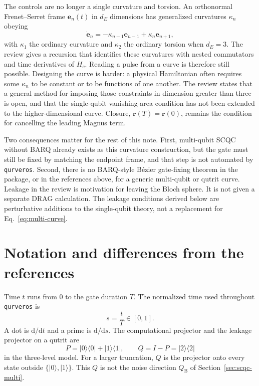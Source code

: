 \documentclass[11pt,a4paper]{article}
\theoremstyle{definition}
\newcommand{\ket}[1]{\lvert #1\rangle}
\newcommand{\bra}[1]{\langle #1\rvert}
\newcommand{\dd}{\mathrm{d}}
\begin{document}
The controls are no longer a single curvature and torsion.  An orthonormal
Frenet--Serret frame \(\mathbf{e}_n(t)\) in \(d_E\) dimensions has generalized
curvatures \(\kappa_n\) obeying
\begin{equation}
  \dot{\mathbf{e}}_n=-\kappa_{n-1}\mathbf{e}_{n-1}+\kappa_n\mathbf{e}_{n+1},
\end{equation}
with \(\kappa_1\) the ordinary curvature and \(\kappa_2\) the ordinary torsion
when \(d_E=3\).  The review gives a recursion that identifies these curvatures
with nested commutators and time derivatives of \(H_c\).  Reading a pulse from
a curve is therefore still possible.  Designing the curve is harder: a
physical Hamiltonian often requires some \(\kappa_n\) to be constant or to be
functions of one another.  The review states that a general method for
imposing those constraints in dimension greater than three is open, and that
the single-qubit vanishing-area condition has not been extended to the
higher-dimensional curve.  Closure, \(\mathbf{r}(T)=\mathbf{r}(0)\), remains
the condition for cancelling the leading Magnus term.

Two consequences matter for the rest of this note.  First, multi-qubit SCQC
without BARQ already exists as this curvature construction, but the gate must
still be fixed by matching the endpoint frame, and that step is not automated
by \texttt{qurveros}.  Second, there is no BARQ-style B\'ezier gate-fixing
theorem in the package, or in the references above, for a generic multi-qubit
or qutrit curve.  Leakage in the review is motivation for leaving the Bloch
sphere.  It is not given a separate DRAG calculation.  The leakage conditions
derived below are perturbative additions to the single-qubit theory, not a
replacement for Eq.~\eqref{eq:multi-curve}.

\section{Notation and differences from the references}
\label{sec:notation}

Time \(t\) runs from \(0\) to the gate duration \(T\).  The normalized time used
throughout \texttt{qurveros} is
\begin{equation}
\label{eq:s}
  s=\frac{t}{T}\in[0,1].
\end{equation}
A dot is \(\dd/\dd t\) and a prime is \(\dd/\dd s\).  The computational
projector and the leakage projector on a qutrit are
\begin{equation}
\label{eq:PQ}
  P=\ket0\bra0+\ket1\bra1,
  \qquad
  Q=I-P=\ket2\bra2
\end{equation}
in the three-level model.  For a larger truncation, \(Q\) is the projector onto
every state outside \(\{\ket0,\ket1\}\).  This \(Q\) is not the noise direction
\(Q_{\mathrm{B}}\) of Section~\ref{sec:scqc-multi}.
\end{document}
